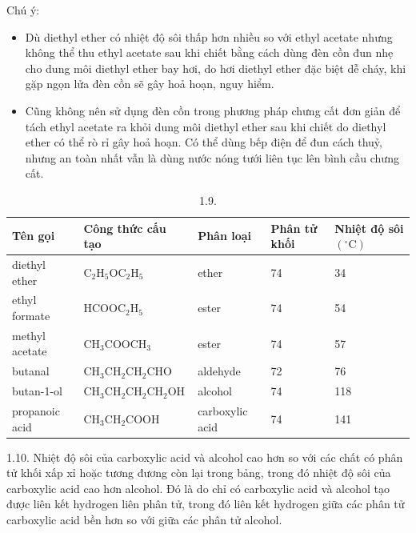 \documentclass[10pt]{article}
\begin{document}
Chú ý:

\begin{itemize}
  \item Dù diethyl ether có nhiệt độ sôi thấp hơn nhiều so với ethyl acetate nhưng không thể thu ethyl acetate sau khi chiết bằng cách dùng đèn cồn đun nhẹ cho dung môi diethyl ether bay hơi, do hơi diethyl ether đặc biệt dễ cháy, khi gặp ngọn lửa đèn cồn sẽ gây hoả hoạn, nguy hiểm.
  \item Cũng không nên sử dụng đèn cồn trong phương pháp chưng cất đơn giản để tách ethyl acetate ra khỏi dung môi diethyl ether sau khi chiết do diethyl ether có thể rò rỉ gây hoả hoạn. Có thể dùng bếp điện để đun cách thuỷ, nhưng an toàn nhất vẫn là dùng nước nóng tưới liên tục lên bình cầu chưng cất.
\end{itemize}

\begin{table}[h]
\begin{center}
\captionsetup{labelformat=empty}
\caption{1.9.}
\begin{tabular}{|l|l|l|l|l|}
\hline
Tên gọi & Công thức cấu tạo & Phân loại & Phân tử khối & Nhiệt độ sôi $\left({ }^{\circ} \mathrm{C}\right)$ \\
\hline
diethyl ether & $\mathrm{C}_{2} \mathrm{H}_{5} \mathrm{OC}_{2} \mathrm{H}_{5}$ & ether & 74 & 34 \\
\hline
ethyl formate & $\mathrm{HCOOC}_{2} \mathrm{H}_{5}$ & ester & 74 & 54 \\
\hline
methyl acetate & $\mathrm{CH}_{3} \mathrm{COOCH}_{3}$ & ester & 74 & 57 \\
\hline
butanal & $\mathrm{CH}_{3} \mathrm{CH}_{2} \mathrm{CH}_{2} \mathrm{CHO}$ & aldehyde & 72 & 76 \\
\hline
butan-1-ol & $\mathrm{CH}_{3} \mathrm{CH}_{2} \mathrm{CH}_{2} \mathrm{CH}_{2} \mathrm{OH}$ & alcohol & 74 & 118 \\
\hline
propanoic acid & $\mathrm{CH}_{3} \mathrm{CH}_{2} \mathrm{COOH}$ & carboxylic acid & 74 & 141 \\
\hline
\end{tabular}
\end{center}
\end{table}

1.10. Nhiệt độ sôi của carboxylic acid và alcohol cao hơn so với các chất có phân tử khối xấp xỉ hoặc tương đương còn lại trong bảng, trong đó nhiệt độ sôi của carboxylic acid cao hơn alcohol. Đó là do chỉ có carboxylic acid và alcohol tạo được liên kết hydrogen liên phân tử, trong đó liên kết hydrogen giữa các phân tử carboxylic acid bền hơn so với giữa các phân tử alcohol.
\end{document}
